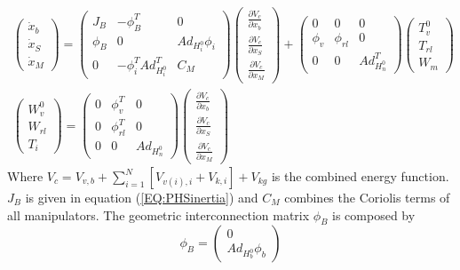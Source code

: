 \documentclass[a4paper,twoside, openright,12pt]{report}
\begin{document}
\begin{eqnarray}
\begin{pmatrix}\dot{x}_b \\ \dot{x}_S  \\ \dot{x}_M \end{pmatrix} =
\begin{pmatrix} J_B & -\phi_B^T & 0 \\ \phi_B & 0 & Ad_{H_i^0} \phi_i \\ 0 & -\phi_i^T Ad_{H_i^0}^T & C_M
 \end{pmatrix}
\begin{pmatrix}\frac{\partial V_{c}}{\partial x_b} \\ \frac{\partial V_{c}}{\partial x_S} \\ \frac{\partial V_{c}}{\partial x_M}\end{pmatrix} +
\begin{pmatrix}0 & 0 & 0\\ \phi_v & \phi_{rl} & 0\\ 0 & 0 & Ad_{H_n^0}^T\end{pmatrix} \begin{pmatrix} T_v^0 \\ T_{rl} \\ W_m\end{pmatrix}
\\
\begin{pmatrix}W_v^0 \\ W_{rl} \\ T_i\end{pmatrix} = \begin{pmatrix}0 & \phi_v^T & 0 \\ 0 & \phi_{rl}^T & 0 \\ 0 & 0 & Ad_{H_n^0}\end{pmatrix}
\begin{pmatrix}\frac{\partial V_{c}}{\partial x_b} \\ \frac{\partial V_{c}}{\partial x_S} \\ \frac{\partial V_{c}}{\partial x_M}\end{pmatrix}
\end{eqnarray}
Where $V_c = V_{v,b} + \sum_{i=1}^N [V_{v(i),i} + V_{k,i}] + V_{kg}$ is the combined energy function. $J_B$ is given in equation (\ref{EQ:PHSinertia}) and $C_M$ combines the Coriolis terms of all manipulators. The geometric interconnection matrix $\phi_B$ is composed by
\[ \phi_B = \begin{pmatrix} 0 \\ Ad_{H_b^0} \phi_b 
\end{pmatrix} \]
\end{document}
